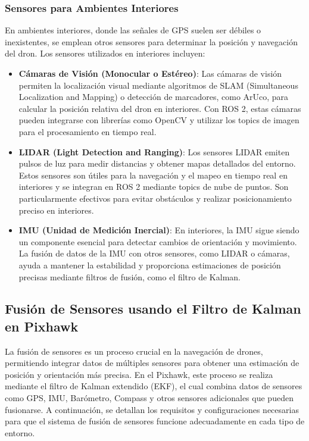     \subsubsection{Sensores para Ambientes Interiores}
    En ambientes interiores, donde las señales de GPS suelen ser débiles o inexistentes, se emplean otros sensores para determinar la posición y navegación del dron. Los sensores utilizados en interiores incluyen:
        \begin{itemize}
            \item \textbf{Cámaras de Visión (Monocular o Estéreo)}: Las cámaras de visión permiten la localización visual mediante algoritmos de SLAM (Simultaneous Localization and Mapping) o detección de marcadores, como ArUco, para calcular la posición relativa del dron en interiores. Con ROS 2, estas cámaras pueden integrarse con librerías como OpenCV y utilizar los topics de imagen para el procesamiento en tiempo real.
            
            \item \textbf{LIDAR (Light Detection and Ranging)}: Los sensores LIDAR emiten pulsos de luz para medir distancias y obtener mapas detallados del entorno. Estos sensores son útiles para la navegación y el mapeo en tiempo real en interiores y se integran en ROS 2 mediante topics de nube de puntos. Son particularmente efectivos para evitar obstáculos y realizar posicionamiento preciso en interiores.
        
            \item \textbf{IMU (Unidad de Medición Inercial)}: En interiores, la IMU sigue siendo un componente esencial para detectar cambios de orientación y movimiento. La fusión de datos de la IMU con otros sensores, como LIDAR o cámaras, ayuda a mantener la estabilidad y proporciona estimaciones de posición precisas mediante filtros de fusión, como el filtro de Kalman.
        \end{itemize}
    
\subsection{Fusión de Sensores usando el Filtro de Kalman en Pixhawk}
    La fusión de sensores es un proceso crucial en la navegación de drones, permitiendo integrar datos de múltiples sensores para obtener una estimación de posición y orientación más precisa. En el Pixhawk, este proceso se realiza mediante el filtro de Kalman extendido (EKF), el cual combina datos de sensores como GPS, IMU, Barómetro, Compass y otros sensores adicionales que pueden fusionarse. A continuación, se detallan los requisitos y configuraciones necesarias para que el sistema de fusión de sensores funcione adecuadamente en cada tipo de entorno.
    

